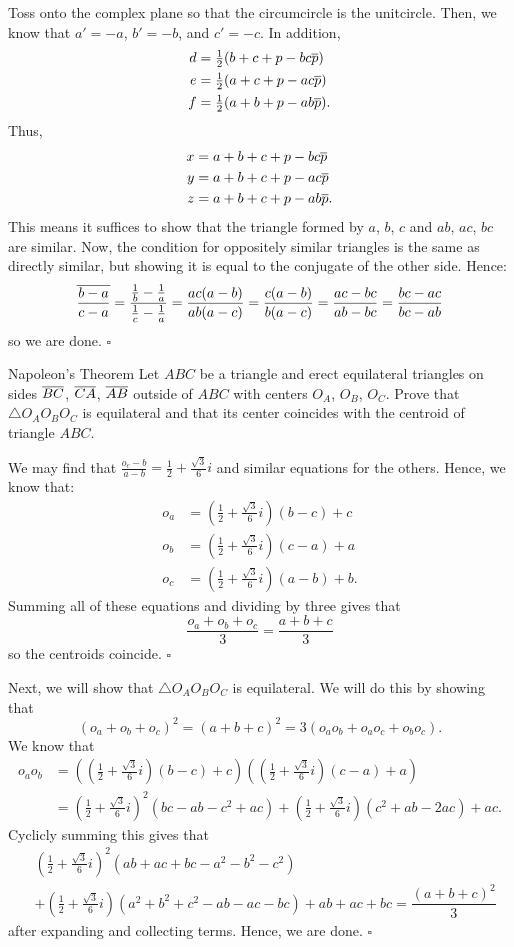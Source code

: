 \documentclass{article}
\begin{document}
Toss onto the complex plane so that the circumcircle is the unitcircle. Then, we know that $a' = -a$, $b' = -b$, and $c' = -c$. In addition, 
\begin{align*}
d &= \tfrac{1}{2}(b+c+p-bc\overline{p}) \\
e &= \tfrac{1}{2}(a+c+p-ac\overline{p}) \\
f &= \tfrac{1}{2}(a+b+p-ab\overline{p}).
\end{align*}
Thus,
\begin{align*}
x &= a+b+c+p-bc\overline{p} \\
y &= a+b+c+p-ac\overline{p} \\
z &= a+b+c+p-ab\overline{p}.
\end{align*}
This means it suffices to show that the triangle formed by $a$, $b$, $c$ and $ab$, $ac$, $bc$ are similar. Now, the condition for oppositely similar triangles is the same as directly similar, but showing it is equal to the conjugate of the other side. Hence: \[\overline{\dfrac{b-a}{c-a}} = \dfrac{\tfrac{1}{b}-\tfrac{1}{a}}{\tfrac{1}{c}-\tfrac{1}{a}} = \dfrac{ac(a-b)}{ab(a-c)} = \dfrac{c(a-b)}{b(a-c)} = \dfrac{ac-bc}{ab-bc} = \dfrac{bc-ac}{bc-ab}\] so we are done. $\square$

\begin{problem}[6.34]{Napoleon's Theorem}
Let $ABC$ be a triangle and erect equilateral triangles on sides $\overline{BC}$, $\overline{CA}$, $\overline{AB}$ outside of $ABC$ with centers $O_A$, $O_B$, $O_C$. Prove that $\triangle O_AO_BO_C$ is equilateral and that its center coincides with the centroid of triangle $ABC$.
\end{problem}

We may find that $\tfrac{o_c-b}{a-b} = \tfrac{1}{2}+\tfrac{\sqrt{3}}{6}i$ and similar equations for the others. Hence, we know that:
\begin{align*}
o_a &= (\tfrac{1}{2}+\tfrac{\sqrt{3}}{6}i)(b-c)+c \\
o_b &= (\tfrac{1}{2}+\tfrac{\sqrt{3}}{6}i)(c-a)+a \\
o_c &= (\tfrac{1}{2}+\tfrac{\sqrt{3}}{6}i)(a-b)+b.
\end{align*}
Summing all of these equations and dividing by three gives that \[\dfrac{o_a+o_b+o_c}{3} = \dfrac{a+b+c}{3}\] so the centroids coincide. $\square$

Next, we will show that $\triangle O_AO_BO_C$ is equilateral. We will do this by showing that \[(o_a+o_b+o_c)^2 = (a+b+c)^2 = 3(o_ao_b+o_ao_c+o_bo_c).\] We know that 
\begin{align*}
o_ao_b &= \left(\left(\tfrac{1}{2}+\tfrac{\sqrt{3}}{6}i\right)(b-c)+c\right)\left(\left(\tfrac{1}{2}+\tfrac{\sqrt{3}}{6}i\right)\left(c-a\right)+a\right) \\
&= \left(\tfrac{1}{2}+\tfrac{\sqrt{3}}{6}i\right)^2(bc-ab-c^2+ac)+\left(\tfrac{1}{2}+\tfrac{\sqrt{3}}{6}i\right)(c^2+ab-2ac)+ac.
\end{align*}
Cyclicly summing this gives that 
\begin{align*}
&\left(\tfrac{1}{2}+\tfrac{\sqrt{3}}{6}i\right)^2(ab+ac+bc-a^2-b^2-c^2)\\
&+\left(\tfrac{1}{2}+\tfrac{\sqrt{3}}{6}i\right)(a^2+b^2+c^2-ab-ac-bc)+ab+ac+bc = \dfrac{(a+b+c)^2}{3}
\end{align*}
after expanding and collecting terms. Hence, we are done. $\square$
\end{document}

